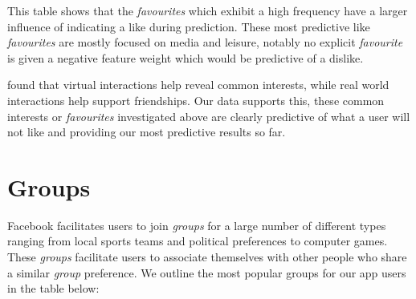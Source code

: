 This table shows that the \emph{favourites} which exhibit a high frequency have a larger influence of indicating a like during prediction. These most 
predictive like \emph{favourites} are mostly focused on media and leisure, notably no explicit \emph{favourite} is given a negative feature 
weight which would be predictive of a dislike.

\cite{brandtzag2011facebook} found that virtual interactions help reveal common interests, while real world interactions help 
support friendships. Our data supports this, these common interests or \emph{favourites} investigated above are clearly predictive 
of what a user will not like and providing our most predictive results so far.


\section{Groups}
\label{sec:groups}

Facebook facilitates users to join \emph{groups} for a large number of different types ranging from 
local sports teams and political preferences to computer games. These \emph{groups} facilitate users to associate
themselves with other people who share a similar \emph{group} preference. We outline the most popular groups for our app users 
in the table below:


